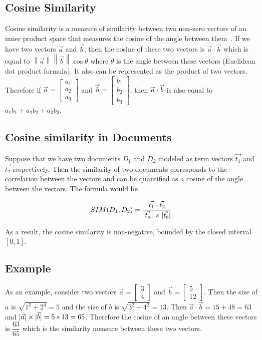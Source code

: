 \documentclass[11pt]{article}
\DeclarePairedDelimiter\abs{\lvert}{\rvert}               %
\begin{document}
\subsection{Cosine Similarity}

Cosine similarity is a measure of similarity between two non-zero vectors of an
inner product space that measures the cosine of the angle between
them~\cite{wikicosine}. If we have two vectors \(\vec{a}\) and \(\vec{b}\), then the cosine of
these two vectors is \(\vec{a} \cdot \vec{b}\) which is equal to
\(\left\|\vec{a}\right\|\left\|\vec{b}\right\|\cos\theta\) where \(\theta\) is the angle
between these vectors (Euclidean dot product formula). It also can be
represented as the product of two vectors. Therefore if
\(\vec{a} = \begin{bmatrix}a_1 \\ a_2 \\ a_3\end{bmatrix}\) and
\(\vec{b} = \begin{bmatrix}b_1 \\ b_2 \\ b_3\end{bmatrix}\), then
\(\vec{a} \cdot \vec{b}\) is also equal to \(a_1b_1 + a_2b_2 + a_3b_3\).

\subsection{Cosine similarity in Documents}

Suppose that we have two documents \(D_1\) and \(D_2\) modeled as term vectors
\(\vec{t_1}\) and \(\vec{t_2}\) respectively.  Then the similarity of two documents
corresponds to the correlation between the vectors and can be quantified as a
cosine of the angle between the vectors.  The formula would be

\[SIM(D_1, D_2) = \dfrac{\vec{t_1} \cdot \vec{t_2}}{\abs{\vec{t_a}} \times
    \abs{\vec{t_b}}}\]

As a result, the cosine similarity is non-negative, bounded by the closed
interval \([0,1]\).

\subsection{Example}

As an example, consider two vectors \(\vec{a} = \begin{bmatrix}3 \\ 4\end{bmatrix}\)
and \(\vec{b} = \begin{bmatrix}5 \\ 12\end{bmatrix}\). Then the size of \(a\) is
\(\sqrt{1^2 + 2^4} = 5\) and the size of \(b\) is \(\sqrt{3^2 + 4^2} = 13\).
Then \(\vec{a} \cdot \vec{b} = 15 + 48 = 63\) and
\(\abs{\vec{a}} \times \abs{\vec{b}} = 5 * 13 = 65\). Therefore
the cosine of an angle between these vectors is \(\dfrac{63}{65}\) which is the
similarity measure between these two vectors.
\end{document}
